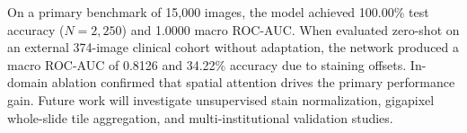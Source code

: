 \documentclass[conference]{IEEEtran}
\begin{document}
On a primary benchmark of 15,000 images, the model achieved 100.00\% test accuracy ($N=2,250$) and 1.0000 macro ROC-AUC. When evaluated zero-shot on an external 374-image clinical cohort without adaptation, the network produced a macro ROC-AUC of 0.8126 and 34.22\% accuracy due to staining offsets. In-domain ablation confirmed that spatial attention drives the primary performance gain. Future work will investigate unsupervised stain normalization, gigapixel whole-slide tile aggregation, and multi-institutional validation studies.

\balance


\end{document}
